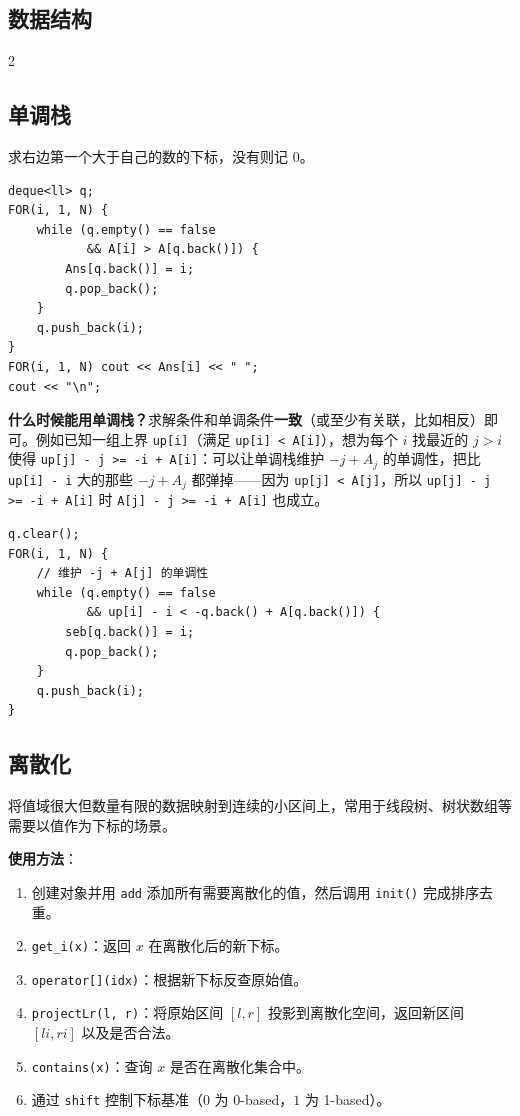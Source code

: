 \begin{center}
	\section{数据结构}
\end{center}

\begin{multicols*}{2}

	\subsection{单调栈}

	求右边第一个大于自己的数的下标，没有则记 $0$。

	\begin{verbatim}
deque<ll> q;
FOR(i, 1, N) {
    while (q.empty() == false
           && A[i] > A[q.back()]) {
        Ans[q.back()] = i;
        q.pop_back();
    }
    q.push_back(i);
}
FOR(i, 1, N) cout << Ans[i] << " ";
cout << "\n";
	\end{verbatim}

	\textbf{什么时候能用单调栈？}求解条件和单调条件\textbf{一致}（或至少有关联，比如相反）即可。例如已知一组上界 \texttt{up[i]}（满足 \texttt{up[i] < A[i]}），想为每个 $i$ 找最近的 $j > i$ 使得 \texttt{up[j] - j >= -i + A[i]}：可以让单调栈维护 $-j + A_j$ 的单调性，把比 \texttt{up[i] - i} 大的那些 $-j + A_j$ 都弹掉——因为 \texttt{up[j] < A[j]}，所以 \texttt{up[j] - j >= -i + A[i]} 时 \texttt{A[j] - j >= -i + A[i]} 也成立。

	\begin{verbatim}
q.clear();
FOR(i, 1, N) {
    // 维护 -j + A[j] 的单调性
    while (q.empty() == false
           && up[i] - i < -q.back() + A[q.back()]) {
        seb[q.back()] = i;
        q.pop_back();
    }
    q.push_back(i);
}
	\end{verbatim}

	\subsection{离散化}

	将值域很大但数量有限的数据映射到连续的小区间上，常用于线段树、树状数组等需要以值作为下标的场景。

	\textbf{使用方法}：

	\begin{enumerate}
		\item 创建对象并用 \texttt{add} 添加所有需要离散化的值，然后调用 \texttt{init()} 完成排序去重。
		\item \texttt{get\_i(x)}：返回 $x$ 在离散化后的新下标。
		\item \texttt{operator[](idx)}：根据新下标反查原始值。
		\item \texttt{projectLr(l, r)}：将原始区间 $[l, r]$ 投影到离散化空间，返回新区间 $[li, ri]$ 以及是否合法。
		\item \texttt{contains(x)}：查询 $x$ 是否在离散化集合中。
		\item 通过 \texttt{shift} 控制下标基准（$0$ 为 0-based，$1$ 为 1-based）。
	\end{enumerate}


\end{multicols*}
